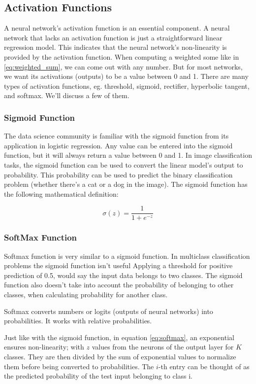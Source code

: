 \subsection*{Activation Functions}
A neural network's activation function is an essential component. A neural network that lacks an activation function is just a straightforward linear regression model. This indicates that the neural network's non-linearity is provided by the activation function. When computing a weighted some like in \ref{eq:weighted_sum}, we can come out with any number. But for most networks, we want its activations (outputs) to be a value between 0 and 1.\newline
There are many types of activation functions, eg. threshold, sigmoid, rectifier, hyperbolic tangent, and softmax. We'll discuss a few of them.

\subsubsection*{Sigmoid Function}
The data science community is familiar with the sigmoid function from its application in logistic regression. Any value can be entered into the sigmoid function, but it will always return a value between 0 and 1. In image classification tasks, the sigmoid function can be used to convert the linear model's output to probability. This probability can be used to predict the binary classification problem (whether there's a cat or a dog in the image). The sigmoid function has the following mathematical definition:

\begin{equation}
	\sigma(z) = \frac{1} {1 + e^{-z}}
\end{equation}

\subsubsection*{SoftMax Function
}
Softmax function is very similar to a sigmoid function. In multiclass classification problems the sigmoid function isn't useful Applying a threshold for positive prediction of 0.5, would say the input data belongs to two classes. The sigmoid function also doesn't take into account the probability of belonging to other classes, when calculating probability for another class. 

Softmax converts numbers or logits (outputs of neural networks) into probabilities. It works with relative probabilities.

Just like with the sigmoid function, in equation \ref{eq:softmax}, an exponential ensures non-linearity; with $z$ values from the neurons of the output layer for $K$ classes. They are then divided by the sum of exponential values to normalize them before being converted to probabilities. The $i$-th entry can be thought of as the predicted probability of the test input belonging to class i.


